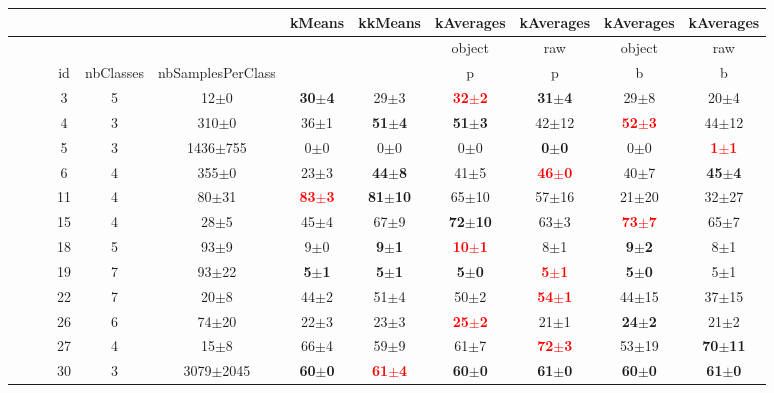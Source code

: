   
\begin{table} 
\begin{center} 
\small 
 \setlength{\tabcolsep}{.16667em} 
\begin{tabular}{lllccccccccc} 
 &  &  &  &  &  & kMeans & kkMeans & kAverages & kAverages & kAverages & kAverages \\ 
\hline 
 &  &  &  &  &  &  &  & object & raw & object & raw \\ 
 &  &  & id & nbClasses & nbSamplesPerClass &  &  & p & p & b & b \\ 
 &  &  &  3 & 5 &      12$\pm$0 & \textbf{30$\pm$4} & 29$\pm$3 & \textbf{\textcolor{red}{32$\pm$2}} & \textbf{31$\pm$4} & 29$\pm$8 & 20$\pm$4 \\ 
 &  &  &  4 & 3 &     310$\pm$0 &  36$\pm$1 & \textbf{ 51$\pm$4} & \textbf{ 51$\pm$3} & 42$\pm$12 & \textbf{\textcolor{red}{ 52$\pm$3}} & 44$\pm$12 \\ 
 &  &  &  5 & 3 &  1436$\pm$755 & 0$\pm$0 & 0$\pm$0 & 0$\pm$0 & \textbf{0$\pm$0} & 0$\pm$0 & \textbf{\textcolor{red}{1$\pm$1}} \\ 
 &  &  &  6 & 4 &     355$\pm$0 & 23$\pm$3 & \textbf{44$\pm$8} & 41$\pm$5 & \textbf{\textcolor{red}{46$\pm$0}} & 40$\pm$7 & \textbf{45$\pm$4} \\ 
 &  &  & 11 & 4 &     80$\pm$31 & \textbf{\textcolor{red}{ 83$\pm$3}} & \textbf{81$\pm$10} & 65$\pm$10 & 57$\pm$16 & 21$\pm$20 & 32$\pm$27 \\ 
 &  &  & 15 & 4 &      28$\pm$5 &  45$\pm$4 &  67$\pm$9 & \textbf{72$\pm$10} &  63$\pm$3 & \textbf{\textcolor{red}{ 73$\pm$7}} &  65$\pm$7 \\ 
 &  &  & 18 & 5 &      93$\pm$9 &  9$\pm$0 & \textbf{ 9$\pm$1} & \textbf{\textcolor{red}{10$\pm$1}} &  8$\pm$1 & \textbf{ 9$\pm$2} &  8$\pm$1 \\ 
 &  &  & 19 & 7 &     93$\pm$22 & \textbf{5$\pm$1} & \textbf{5$\pm$1} & \textbf{5$\pm$0} & \textbf{\textcolor{red}{5$\pm$1}} & \textbf{5$\pm$0} & 5$\pm$1 \\ 
 &  &  & 22 & 7 &      20$\pm$8 &  44$\pm$2 &  51$\pm$4 &  50$\pm$2 & \textbf{\textcolor{red}{ 54$\pm$1}} & 44$\pm$15 & 37$\pm$15 \\ 
 &  &  & 26 & 6 &     74$\pm$20 & 22$\pm$3 & 23$\pm$3 & \textbf{\textcolor{red}{25$\pm$2}} & 21$\pm$1 & \textbf{24$\pm$2} & 21$\pm$2 \\ 
 &  &  & 27 & 4 &      15$\pm$8 &  66$\pm$4 &  59$\pm$9 &  61$\pm$7 & \textbf{\textcolor{red}{ 72$\pm$3}} & 53$\pm$19 & \textbf{70$\pm$11} \\ 
 &  &  & 30 & 3 & 3079$\pm$2045 & \textbf{60$\pm$0} & \textbf{\textcolor{red}{61$\pm$4}} & \textbf{60$\pm$0} & \textbf{61$\pm$0} & \textbf{60$\pm$0} & \textbf{61$\pm$0} \\ 

\end{tabular}
\end{center}
\end{table}
